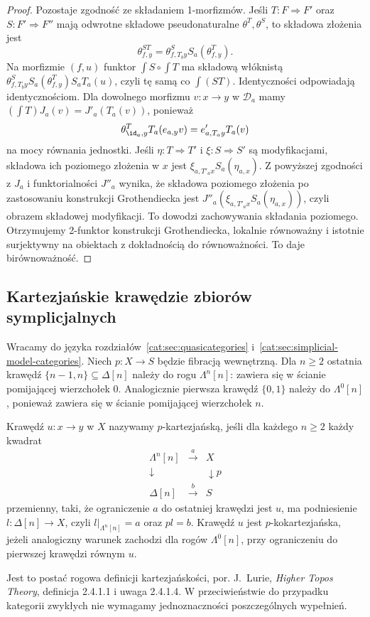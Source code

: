 \begin{proof}
Pozostaje zgodność ze składaniem 1-morfizmów. Jeśli $T:F\Rightarrow F'$ oraz $S:F'\Rightarrow F''$ mają odwrotne składowe pseudonaturalne $\theta^T,\theta^S$, to składowa złożenia jest
\[
 \theta^{ST}_{f,y}=\theta^S_{f,T_by}S_a(\theta^T_{f,y}).
\]
Na morfizmie $(f,u)$ funktor $\int S\circ\int T$ ma składową włóknistą $\theta^S_{f,T_by}S_a(\theta^T_{f,y})S_aT_a(u)$, czyli tę samą co $\int(ST)$. Identyczności odpowiadają identycznościom. Dla dowolnego morfizmu $v:x\to y$ w $\mathcal D_a$ mamy $(\int T)J_a(v)=J'_a(T_a(v))$, ponieważ
\[
 \theta^T_{\id_a,y}T_a(e_{a,y}v)=e'_{a,T_ay}T_a(v)
\]
na mocy równania jednostki. Jeśli $\eta:T\Rightarrow T'$ i $\xi:S\Rightarrow S'$ są modyfikacjami, składowa ich poziomego złożenia w $x$ jest $\xi_{a,T'_ax}S_a(\eta_{a,x})$. Z powyższej zgodności z $J_a$ i funktorialności $J''_a$ wynika, że składowa poziomego złożenia po zastosowaniu konstrukcji Grothendiecka jest $J''_a(\xi_{a,T'_ax}S_a(\eta_{a,x}))$, czyli obrazem składowej modyfikacji. To dowodzi zachowywania składania poziomego. Otrzymujemy 2-funktor konstrukcji Grothendiecka, lokalnie równoważny i istotnie surjektywny na obiektach z dokładnością do równoważności. To daje birównoważność.
\end{proof}

\subsection{Kartezjańskie krawędzie zbiorów symplicjalnych}

Wracamy do języka rozdziałów~\ref{cat:sec:quasicategories} i~\ref{cat:sec:simplicial-model-categories}. Niech $p:X\to S$ będzie fibracją wewnętrzną. Dla $n\geq2$ ostatnia krawędź $\{n-1,n\}\subseteq\Delta[n]$ należy do rogu $\Lambda^n[n]$: zawiera się w ścianie pomijającej wierzchołek $0$. Analogicznie pierwsza krawędź $\{0,1\}$ należy do $\Lambda^0[n]$, ponieważ zawiera się w ścianie pomijającej wierzchołek $n$.

\begin{definicja}\label{cat:def:cartesian-simplicial-edge}
Krawędź $u:x\to y$ w $X$ nazywamy $p$-kartezjańską, jeśli dla każdego $n\geq2$ każdy kwadrat
\[
\begin{array}{ccc}
 \Lambda^n[n]&\xrightarrow{a}&X\\
 \downarrow&&\downarrow p\\
 \Delta[n]&\xrightarrow{b}&S
\end{array}
\]
przemienny, taki, że ograniczenie $a$ do ostatniej krawędzi jest $u$, ma podniesienie $l:\Delta[n]\to X$, czyli $l|_{\Lambda^n[n]}=a$ oraz $pl=b$. Krawędź $u$ jest $p$-kokartezjańska, jeżeli analogiczny warunek zachodzi dla rogów $\Lambda^0[n]$, przy ograniczeniu do pierwszej krawędzi równym $u$.
\end{definicja}
Jest to postać rogowa definicji kartezjańskości, por. J.~Lurie, \emph{Higher Topos Theory}, definicja 2.4.1.1 i uwaga 2.4.1.4. W przeciwieństwie do przypadku kategorii zwykłych nie wymagamy jednoznaczności poszczególnych wypełnień.

